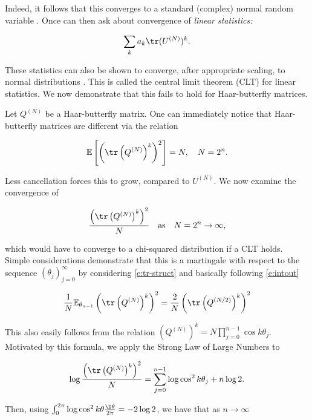 Indeed, it follows that this converges to a standard (complex) normal random variable \cite{Diaconis2001}.  Once can then ask about convergence of \emph{linear statistics:}

\begin{align}
  \sum_k a_k \tr (U^{(N)})^k.
\end{align}

These statistics can also be shown to converge, after appropriate scaling, to normal distributions \cite{Diaconis2001}.  This is called the central limit theorem (CLT) for linear statistics.  We now demonstrate that this fails to hold for Haar-butterfly matrices.

Let $Q^{(N)}$ be a Haar-butterfly matrix. One can immediately notice that Haar-butterfly matrices are different via the relation

\begin{align}
\mathbb E \left[ \left( \tr \left( Q^{(N)} \right)^k \right)^2 \right] = N, \quad N = 2^n.
\end{align}

Less cancellation forces this to grow, compared to $U^{(N)}$.  We now examine the convergence of

\begin{align}\label{e:clt}
 \frac{\left(\tr \left(Q^{(N)} \right)^k \right)^2}{N} \quad \text{as} \quad N = 2^n \to \infty,
\end{align}

which would have to converge to a chi-squared distribution if a CLT holds.  Simple considerations demonstrate that this is a martingale with respect to the sequence $(\theta_j)_{j=0}^\infty$ by considering \eqref{e:tr-struct} and basically following \eqref{e:intout}

\begin{align}
\frac{1}{N} \mathbb E_{\theta_{n-1}} \left( \tr\left(Q^{(N)} \right)^k \right)^2  =  \frac{2}{N} \left( \tr \left(Q^{(N/2)} \right)^k \right)^2
\end{align}

This also easily follows from the relation $\left(Q^{(N)} \right)^k = N \prod_{j=0}^{n-1} \cos k \theta_j$.   Motivated by this formula, we apply the Strong Law of Large Numbers to

\begin{align}
  \log \frac{\left( \tr \left(Q^{(N)} \right)^k\right)^2}{N} = \sum_{j=0}^{n-1} \log \cos^2 k\theta_j + n \log 2.
\end{align}

Then, using $\int_{0}^{2\pi} \log \cos^2 k\theta \frac{\D \theta}{2 \pi} = - 2 \log 2$, we have that as $n \to \infty$

